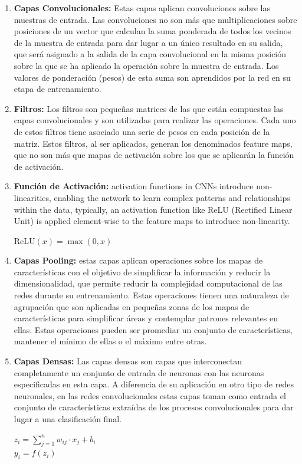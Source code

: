 \documentclass{uathesis-es}
\begin{document}
\begin{enumerate}
	\item \textbf{Capas Convolucionales:} Estas capas aplican convoluciones sobre las muestras de entrada. Las convoluciones no son más que multiplicaciones sobre posiciones de un vector que calculan la suma ponderada de todos los vecinos de la muestra de entrada para dar lugar a un único resultado en su salida, que será asignado a la salida de la capa convolucional en la misma posición sobre la que se ha aplicado la operación sobre la muestra de entrada. Los valores de ponderación (pesos) de esta suma son aprendidos por la red en su etapa de entrenamiento.
	
	\item \textbf{Filtros:} Los filtros son pequeñas matrices de las que están compuestas las capas convolucionales y son utilizadas para realizar las operaciones. Cada uno de estos filtros tiene asociado una serie de pesos en cada posición de la matriz. Estos filtros, al ser aplicados, generan los denominados feature maps, que no son más que mapas de activación sobre los que se aplicarán la función de activación.
	
	\item \textbf{Función de Activación:} activation functions in CNNs introduce non-linearities, enabling the network to learn complex patterns and relationships within the data, typically, an activation function like ReLU (Rectified Linear Unit) is applied element-wise to the feature maps to introduce non-linearity. \begin{center}
		$\text{ReLU}(x) = \max(0, x)$
	\end{center}
	
	\item \textbf{Capas Pooling:} estas capas aplican operaciones sobre los mapas de características con el objetivo de simplificar la información y reducir la dimensionalidad, que permite reducir la complejidad computacional de las redes durante su entrenamiento. Estas operaciones tienen una naturaleza de agrupación que son aplicadas en pequeñas zonas de los mapas de características para simplificar áreas y contemplar patrones relevantes en ellas. Estas operaciones pueden ser promediar un conjunto de características, mantener el mínimo de ellas o el máximo entre otras.
	
	\item \textbf{Capas Densas:} Las capas densas son capas que interconectan completamente un conjunto de entrada de neuronas con las neuronas especificadas en esta capa. A diferencia de su aplicación en otro tipo de redes neuronales, en las redes convolucionales estas capas toman como entrada el conjunto de características extraídas de los procesos convolucionales para dar lugar a una clasificación final.
	\begin{center}
		$z_i = \sum_{j=1}^{n} w_{ij} \cdot x_j + b_i$\\
		$y_i = f(z_i)$
	\end{center}
\end{enumerate}
\end{document}
